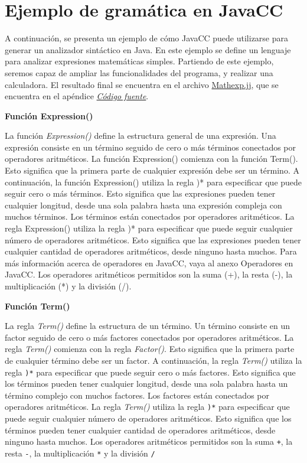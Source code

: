 \section{Ejemplo de gramática en JavaCC}
A continuación, se presenta un ejemplo de cómo JavaCC puede utilizarse para generar un analizador sintáctico en Java. En este ejemplo se define un lenguaje para analizar expresiones matemáticas simples. Partiendo de este ejemplo, seremos capaz de ampliar las funcionalidades del programa, y realizar una calculadora. El resultado final se encuentra en el archivo \hyperref[sec:mathexp]{Mathexp.jj}, que se encuentra en el apéndice \hyperref[sec:codigofuente]{\textit{Código fuente}}.


\textbf{Función Expression()}

\lstset{inputencoding=utf8/latin1}


La función \textit{Expression()} define la estructura general de una expresión. Una expresión consiste en un término seguido de cero o más términos conectados por operadores aritméticos. La función Expression() comienza con la función Term(). Esto significa que la primera parte de cualquier expresión debe ser un término. A continuación, la función Expression() utiliza la regla )* para especificar que puede seguir cero o más términos. Esto significa que las expresiones pueden tener cualquier longitud, desde una sola palabra hasta una expresión compleja con muchos términos.
Los términos están conectados por operadores aritméticos. La regla Expression() utiliza la regla )* para especificar que puede seguir cualquier número de operadores aritméticos. Esto significa que las expresiones pueden tener cualquier cantidad de operadores aritméticos, desde ninguno hasta muchos. Para más información acerca de operadores en JavaCC, vaya al anexo Operadores en JavaCC.
Los operadores aritméticos permitidos son la suma (+), la resta (-), la multiplicación (*) y la división (/). 

\textbf{Función Term()}
\lstset{inputencoding=utf8/latin1}


La regla \textit{Term()} define la estructura de un término. Un término consiste en un factor seguido de cero o más factores conectados por operadores aritméticos. La regla \textit{Term()} comienza con la regla \textit{Factor()}. Esto significa que la primera parte de cualquier término debe ser un factor. A continuación, la regla \textit{Term()} utiliza la regla \lstinline|)*| para especificar que puede seguir cero o más factores. Esto significa que los términos pueden tener cualquier longitud, desde una sola palabra hasta un término complejo con muchos factores.
Los factores están conectados por operadores aritméticos. La regla \textit{Term()} utiliza la regla \lstinline|)*| para especificar que puede seguir cualquier número de operadores aritméticos. Esto significa que los términos pueden tener cualquier cantidad de operadores aritméticos, desde ninguno hasta muchos.
Los operadores aritméticos permitidos son la suma \lstinline|+|, la resta \lstinline|-|, la multiplicación \lstinline|*| y la división \lstinline|/|

